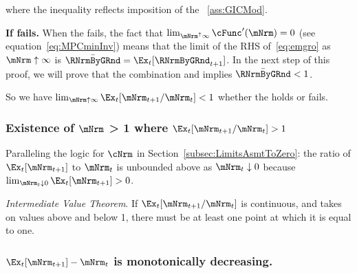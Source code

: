 \documentclass[\econtexRoot/BufferStockTheory]{subfiles}
\begin{document}
where the inequality reflects imposition of the \GICMod~\eqref{ass:GICMod}.

\textbf{If {\RIC} fails.}  When the {\RIC} fails, the fact that $\lim_{\mNrm^{\uparrow} \infty} \cFunc^{\prime}(\mNrm) = 0$ (see equation~\eqref{eq:MPCminInv}) means that the limit of the RHS of~\eqref{eq:emgro} as $\mNrm \uparrow \infty$ is $\bar{\RNrmByGRnd}=\Ex_{t}[\RNrmByGRnd_{t+1}]$.
In the next step of this proof, we will prove that the combination {\GICMod} and \cncl{\RIC} implies $\bar{\RNrmByGRnd} < 1$.

So we have $\lim_{\mNrm \uparrow \infty} \Ex_{t}[\mNrm_{t+1}/\mNrm_{t}] < 1$ whether the {\RIC} holds or fails.

\medskip

\subsubsection{Existence of \texorpdfstring{$\mNrm$}{m} > 1 where \texorpdfstring{$\Ex_t [{\mNrm}_{t+1}/\mNrm_t] > 1$}{E[m{t+1}/m{t}] > 1}}
Paralleling the logic for $\cNrm$ in Section~\ref{subsec:LimitsAsmtToZero}: the ratio of $\Ex_{t}[\mNrm_{t+1}]$ to $\mNrm_{t}$ is unbounded above as $\mNrm_{t} \downarrow 0$ because $\lim_{\mNrm_{t}\downarrow 0} \Ex_{t}[\mNrm_{t+1}] > 0$.

\medskip\medskip

\noindent \textit{Intermediate Value Theorem}.
If $\Ex_t [{\mNrm}_{t+1}/\mNrm_t]$ is continuous, and takes on values above and below 1, there must be at least one point at which it is equal to one.

\subsubsection{\texorpdfstring{$\Ex_t [{\mNrm}_{t+1}] -\mNrm_t$}{Delta m} is monotonically decreasing.}
\end{document}
